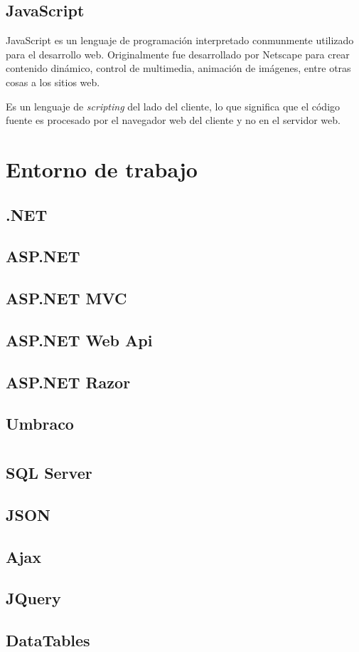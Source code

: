 \subsection{JavaScript}
JavaScript es un lenguaje de programación  interpretado conmunmente utilizado para el desarrollo web. Originalmente fue desarrollado por Netscape para crear contenido dinámico, control de multimedia, animación de imágenes, entre otras cosas a los sitios web.

Es un lenguaje de \textit{scripting} del lado del cliente, lo que significa que el código fuente es procesado por el navegador web del cliente y no en el servidor web. \cite{javaScriptChristensson}


\section{Entorno de trabajo}
\subsection{.NET}
\subsection{ASP.NET}
\subsection{ASP.NET MVC}
\subsection{ASP.NET Web Api}
\subsection{ASP.NET Razor}
\subsection{Umbraco}

\section{}
\subsection{SQL Server}
\subsection{JSON}
\subsection{Ajax}
\subsection{JQuery}
\subsection{DataTables}

